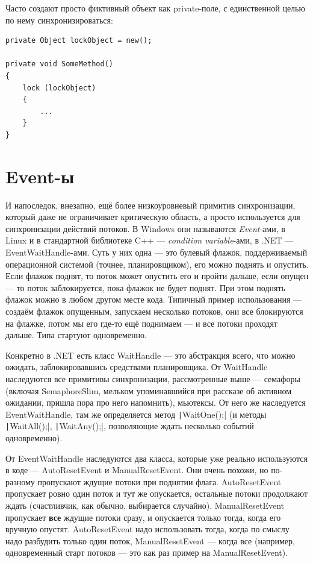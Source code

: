 \documentclass[a5paper]{article}
\begin{document}
Часто создают просто фиктивный объект как private-поле, с единственной целью по нему синхронизироваться:
\begin{verbatim}
private Object lockObject = new();

private void SomeMethod() 
{
    lock (lockObject) 
    {
        ...
    }
}
\end{verbatim}

\section{Event-ы}

И напоследок, внезапно, ещё более низкоуровневый примитив синхронизации, который даже не ограничивает критическую область, а просто используется для синхронизации действий потоков. В Windows они называются \textit{Event}-ами, в Linux и в стандартной библиотеке C++ --- \textit{condition variable}-ами, в .NET --- EventWaitHandle-ами. Суть у них одна --- это булевый флажок, поддерживаемый операционной системой (точнее, планировщиком), его можно поднять и опустить. Если флажок поднят, то поток может опустить его и пройти дальше, если опущен --- то поток заблокируется, пока флажок не будет поднят. При этом поднять флажок можно в любом другом месте кода. Типичный пример использования --- создаём флажок опущенным, запускаем несколько потоков, они все блокируются на флажке, потом мы его где-то ещё поднимаем --- и все потоки проходят дальше. Типа стартуют одновременно.

Конкретно в .NET есть класс WaitHandle --- это абстракция всего, что можно ожидать, заблокировавшись средствами планировщика. От WaitHandle наследуются все примитивы синхронизации, рассмотренные выше --- семафоры (включая SemaphoreSlim, мельком упоминавшийся при рассказе об активном ожидании, пришла пора про него напомнить), мьютексы. От него же наследуется EventWaitHandle, там же определяется метод \texttt|WaitOne();| (и методы \texttt|WaitAll();|, \texttt|WaitAny();|, позволяющие ждать несколько событий одновременно).

От EventWaitHandle наследуются два класса, которые уже реально используются в коде --- AutoResetEvent и ManualResetEvent. Они очень похожи, но по-разному пропускают ждущие потоки при поднятии флага. AutoResetEvent пропускает ровно один поток и тут же опускается, остальные потоки продолжают ждать (счастливчик, как обычно, выбирается случайно). ManualResetEvent пропускает \textbf{все} ждущие потоки сразу, и опускается только тогда, когда его вручную опустят. AutoResetEvent надо использовать тогда, когда по смыслу надо разбудить только один поток, ManualResetEvent --- когда все  (например, одновременный старт потоков --- это как раз пример на ManualResetEvent).
\end{document}
